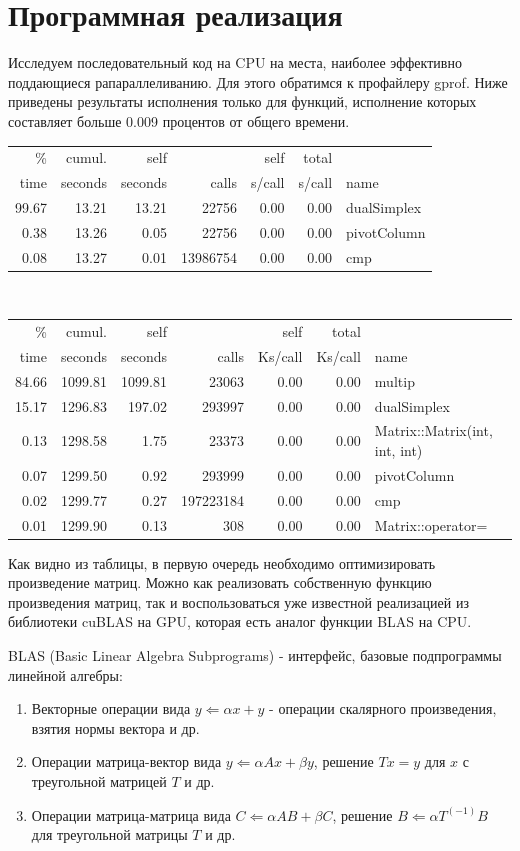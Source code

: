 \documentclass[a4paper,14pt,russian]{extreport}
\begin{document}
\section{Программная реализация}
Исследуем последовательный код на CPU на места, наиболее эффективно поддающиеся рапараллеливанию. Для этого обратимся к профайлеру gprof. Ниже приведены результаты исполнения только для функций, исполнение которых составляет больше 0.009 процентов от общего времени.
\\
\begin{tabular}{rrrrrrp{3cm}}
  \% &  cumul. &  self    & &         self  &   total    \\       
 time  & seconds &  seconds  &  calls &  s/call &  s/call & name    \\
 99.67  &   13.21  &  13.21 &   22756 &    0.00 &    0.00 & dualSimplex\\
  0.38  &   13.26  &   0.05  &  22756 &    0.00  &   0.00 & pivotColumn\\
  0.08   &  13.27 &    0.01 & 13986754 &    0.00 &    0.00 &  cmp\\
\end{tabular}
\\
\begin{tabular}{rrrrrrp{3cm}}
  \% &  cumul. &  self  &          &  self  &   total    & \\       
 time  & seconds  & seconds  &  calls & Ks/call & Ks/call &  name  \\  
 84.66 &  1099.81 & 1099.81 &   23063 &    0.00  &   0.00 & multip\\
 15.17 &  1296.83 &  197.02  & 293997  &   0.00  &   0.00 & dualSimplex\\
  0.13 &  1298.58  &   1.75  &  23373  &   0.00  &   0.00 & Matrix::Matrix(int, int, int)\\
  0.07 &  1299.50  &   0.92 &  293999  &   0.00  &   0.00 & pivotColumn\\
  0.02 &  1299.77  &   0.27 & 197223184  &   0.00 &    0.00 & cmp\\
  0.01 &  1299.90  &   0.13  &    308   &  0.00  &   0.00 & Matrix::operator=\\
\end{tabular}
\par
Как видно из таблицы, в первую очередь необходимо оптимизировать произведение матриц. Можно как реализовать собственную функцию произведения матриц, так и воспользоваться уже известной реализацией из библиотеки cuBLAS на GPU, которая есть аналог функции BLAS на CPU. 
\par
BLAS (Basic Linear Algebra Subprograms) - интерфейс, базовые подпрограммы линейной алгебры:
\begin{enumerate}
\item Векторные операции вида $y\Leftarrow\alpha x + y$ - операции скалярного произведения, взятия нормы вектора и др.
\item Операции матрица-вектор вида $y\Leftarrow\alpha Ax + \beta y$, решение $Tx = y$ для $x$ с треугольной матрицей $T$ и др.
\item Операции матрица-матрица вида $C\Leftarrow \alpha AB + \beta C$, решение $B\Leftarrow \alpha T^(-1)B$ для треугольной матрицы $T$ и др.
\end{enumerate}
\end{document}
